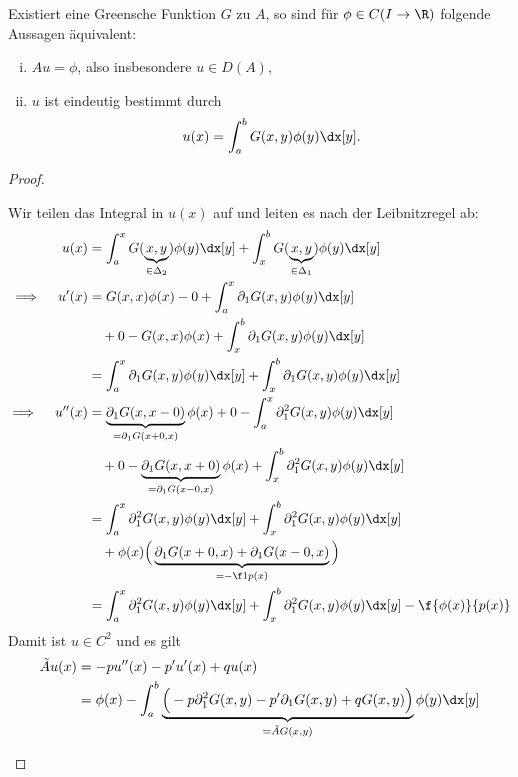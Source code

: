 \begin{st} \label{3.12}
	Existiert eine Greensche Funktion $G$ zu $A$, so sind für $\phi \in C(I \to \R)$ folgende Aussagen äquivalent:
	\begin{enumerate}[(i)]
		\item
			$Au = \phi$, also insbesondere $u \in D(A)$,
		\item
			$u$ ist eindeutig bestimmt durch
			\[
				u(x) = \int_a^b G(x,y) \phi(y) \dx[y].
			\]
	\end{enumerate}
	\begin{proof}
		\begin{seg}[(ii) $\implies$ (i)]
			Wir teilen das Integral in $u(x)$ auf und leiten es nach der Leibnitzregel ab:
			\begin{align*}
				u(x)
				&= \int_a^x G(\underbrace{x,y}_{\in \Delta_2})\phi(y) \dx[y] + \int_x^b G(\underbrace{x,y}_{\in \Delta_1})\phi(y) \dx[y] \\
				\implies \quad u'(x) &=
				G(x,x) \phi(x) - 0 + \int_a^x \partial_1 G(x,y) \phi(y) \dx[y]  \\
				&\quad + 0 - G(x,x) \phi(x) + \int_x^b \partial_1 G(x,y) \phi(y) \dx[y] \\
				&=\int_a^x \partial_1 G(x,y) \phi(y) \dx[y] + \int_x^b \partial_1 G(x,y) \phi(y) \dx[y]  \\
				\implies \quad u''(x) &=
				\underbrace{\partial_1 G(x,x-0)}_{= \partial_1 G(x+0,x)} \phi(x) + 0 - \int_a^x \partial_1^2 G(x,y) \phi(y) \dx[y] \\
				&\quad+ 0 - \underbrace{\partial_1 G(x,x+0)}_{=\partial_1 G(x-0,x)} \phi(x) + \int_x^b \partial_1^2 G(x,y) \phi(y) \dx[y] \\
				&= \int_a^x \partial_1^2 G(x,y) \phi(y) \dx[y] + \int_x^b \partial_1^2 G(x,y) \phi(y) \dx[y]  \\
				&\quad + \phi(x)\Big(\underbrace{\partial_1 G(x+0,x) + \partial_1 G(x-0,x)}_{= - \f 1{p(x)}}\Big) \\
				&= \int_a^x \partial_1^2 G(x,y) \phi(y) \dx[y] + \int_x^b \partial_1^2 G(x,y) \phi(y) \dx[y] - \f {\phi(x)}{p(x)} \\
			\end{align*}
			Damit ist $u \in C^2$ und es gilt
			\begin{align*}
				\tilde A u(x) 
				&= -p u''(x) - p'u'(x) + qu(x) \\
				&= \phi(x) - \int_a^b \underbrace{\Big( -p \partial_1^2 G(x,y) - p' \partial_1 G(x,y) + qG(x,y) \Big)}_{=\tilde A G(x,y)} \phi(y) \dx[y] \\

\end{align*}
\end{seg}
\end{proof}
\end{st}
